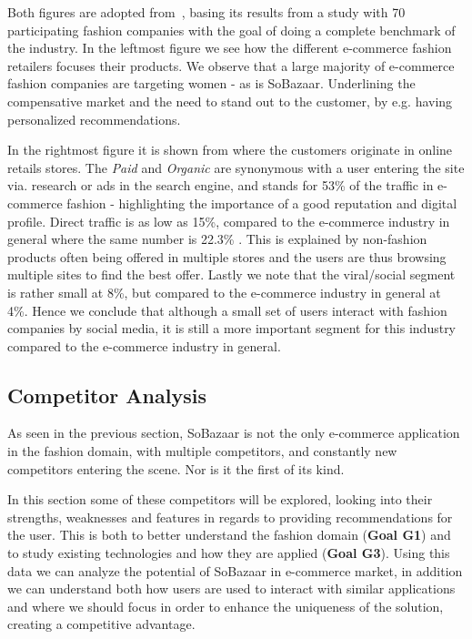 Both figures are adopted from~\cite{Jorij2012}, basing its results from a study
with 70 participating fashion companies with the goal of doing a complete
benchmark of the industry. In the leftmost figure we see how the different
e-commerce fashion retailers focuses their products. We observe that a large
majority of e-commerce fashion companies are targeting women - as is
SoBazaar.  Underlining the compensative market and the need to stand out to
the customer, by e.g. having personalized recommendations.

In the rightmost figure it is shown from where the customers originate in
online retails stores. The \textit{Paid} and \textit{Organic} are synonymous
with a user entering the site via. research or ads in the search engine, and
stands for 53\% of the traffic in e-commerce fashion - highlighting the
importance of a good reputation and digital profile. Direct traffic is as low
as 15\%, compared to the e-commerce industry in general where the same number
is 22.3\% \cite{Jorij2012}. This is explained by non-fashion products often
being offered in multiple stores and the users are thus browsing multiple sites
to find the best offer. Lastly we note that the viral/social segment is rather
small at 8\%, but compared to the e-commerce industry in general at 4\%. Hence
we conclude that although a small set of users interact with fashion companies
by social media, it is still a more important segment for this industry
compared to the e-commerce industry in general.

\subsection{Competitor Analysis}
\label{subsec:competitors}

As seen in the previous section, SoBazaar is not the only e-commerce
application in the fashion domain, with multiple competitors, and constantly new competitors entering the scene. Nor is it the first of its kind.

In this section some of these competitors will be explored,
looking into their strengths, weaknesses and features in regards to providing
recommendations for the user. This is both to better understand the fashion
domain (\textbf{Goal G1}) and to study existing technologies and how they are
applied (\textbf{Goal G3}). Using this data we can analyze the potential of
SoBazaar in e-commerce market, in addition we can understand both how users are
used to interact with similar applications and where we should focus in order
to enhance the uniqueness of the solution, creating a competitive advantage.

